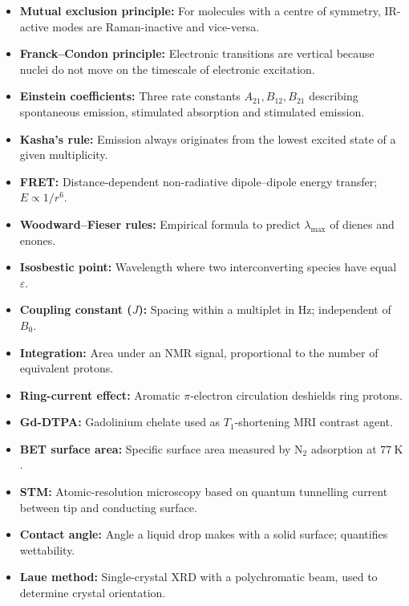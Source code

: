 \documentclass[12pt,a4paper]{article}
\begin{document}
\begin{tcolorbox}[defbox, title={One-Line Definitions}]
\begin{itemize}[leftmargin=*, itemsep=2pt, topsep=2pt]
  \item \textbf{Mutual exclusion principle:} For molecules with a centre of symmetry, IR-active modes are Raman-inactive and vice-versa.
  \item \textbf{Franck--Condon principle:} Electronic transitions are vertical because nuclei do not move on the timescale of electronic excitation.
  \item \textbf{Einstein coefficients:} Three rate constants $A_{21}, B_{12}, B_{21}$ describing spontaneous emission, stimulated absorption and stimulated emission.
  \item \textbf{Kasha's rule:} Emission always originates from the lowest excited state of a given multiplicity.
  \item \textbf{FRET:} Distance-dependent non-radiative dipole--dipole energy transfer; $E\propto 1/r^{6}$.
  \item \textbf{Woodward--Fieser rules:} Empirical formula to predict $\lambda_{\max}$ of dienes and enones.
  \item \textbf{Isosbestic point:} Wavelength where two interconverting species have equal $\varepsilon$.
  \item \textbf{Coupling constant ($J$):} Spacing within a multiplet in Hz; independent of $B_0$.
  \item \textbf{Integration:} Area under an NMR signal, proportional to the number of equivalent protons.
  \item \textbf{Ring-current effect:} Aromatic $\pi$-electron circulation deshields ring protons.
  \item \textbf{Gd-DTPA:} Gadolinium chelate used as $T_1$-shortening MRI contrast agent.
  \item \textbf{BET surface area:} Specific surface area measured by $\mathrm{N_2}$ adsorption at $77\ \mathrm{K}$.
  \item \textbf{STM:} Atomic-resolution microscopy based on quantum tunnelling current between tip and conducting surface.
  \item \textbf{Contact angle:} Angle a liquid drop makes with a solid surface; quantifies wettability.
  \item \textbf{Laue method:} Single-crystal XRD with a polychromatic beam, used to determine crystal orientation.
\end{itemize}
\end{tcolorbox}
\end{document}
